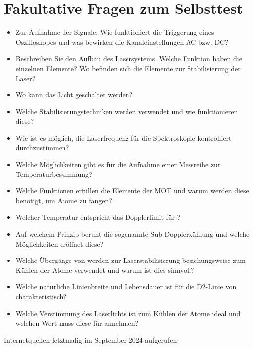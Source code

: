\documentclass[
class=book,
accentcolor=1b,
custommargins=geometry,
fontsize=11pt,
thesis={type=Versuchsanleitung},
ruledheaders=all,
headline=false,
instbox=false,
marginpar=false,
title=small,
ignore-missing-data=true,
twoside=false,
logofile=apqdesign/tuda_logo.pdf,
pdfa=false %
]{apqpub}
\begin{document}
					\section{Fakultative Fragen zum Selbsttest}
					\begin{itemize}
						\item Zur Aufnahme der Signale: Wie funktioniert die Triggerung eines Oszilloskopes und was bewirken die Kanaleinstellungen AC bzw. DC? 
						\item Beschreiben Sie den Aufbau des Lasersystems. Welche Funktion haben die einzelnen Elemente? Wo befinden sich die Elemente zur Stabilisierung der Laser? 
						\item Wo kann das Licht geschaltet werden?				
						\item Welche Stabilisierungstechniken werden verwendet und wie funktionieren diese?
						\item Wie ist es möglich, die Laserfrequenz für die Spektroskopie kontrolliert durchzustimmen?
						\item Welche Möglichkeiten gibt es für die Aufnahme einer Messreihe zur Temperaturbestimmung?
						\item Welche Funktionen erfüllen die Elemente der MOT und warum werden diese benötigt, um Atome zu fangen?
						\item Welcher Temperatur entspricht das Dopplerlimit für ?
						\item Auf welchem Prinzip beruht die sogenannte Sub-Dopplerkühlung und welche Möglichkeiten eröffnet diese?
						\item Welche Übergänge von  werden zur Laserstabilisierung beziehungsweise zum Kühlen der Atome verwendet und warum ist dies sinnvoll?
						\item Welche natürliche Linienbreite und Lebensdauer ist für die D2-Linie von  charakteristisch?
						\item Welche Verstimmung des Laserlichts ist zum Kühlen der Atome ideal und welchen Wert muss diese für  annehmen?
					\end{itemize}

\printbibliography
Internetquellen letztmalig im September 2024 aufgerufen				
					
					\appendix				
\end{document}
